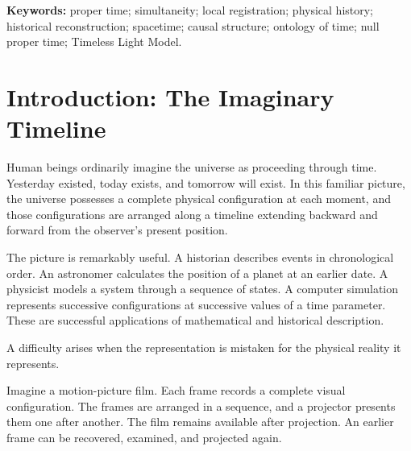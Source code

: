 \documentclass[12pt,onecolumn]{article}
\begin{document}
\begin{abstract}
The result also clarifies the null proper-time foundation of the Timeless Light Model. There is no universal clock from which the photon needs an exemption. Emission and absorption possess registered spacetime relationships, but the photon relation accumulates no internal proper time. The apparent paradox arises from assigning a universal temporal progression to physical reality and then treating light as an exception. Removing that assumption eliminates the need for the exception.

The proposed architecture is a universe of locally registered physical conditions governed by timeless lawful structure. Earlier configurations are reconstructed, and subsequent configurations are predicted. Neither is an additional layer of present physical actuality.

The past is not somewhere else. It is not somewhere at all.

\end{abstract}

\noindent\textbf{Keywords:} proper time; simultaneity; local registration; physical history; historical reconstruction; spacetime; causal structure; ontology of time; null proper time; Timeless Light Model.

\section{Introduction: The Imaginary Timeline}

Human beings ordinarily imagine the universe as proceeding through time. Yesterday existed, today exists, and tomorrow will exist. In this familiar picture, the universe possesses a complete physical configuration at each moment, and those configurations are arranged along a timeline extending backward and forward from the observer's present position.

The picture is remarkably useful. A historian describes events in chronological order. An astronomer calculates the position of a planet at an earlier date. A physicist models a system through a sequence of states. A computer simulation represents successive configurations at successive values of a time parameter. These are successful applications of mathematical and historical description.

A difficulty arises when the representation is mistaken for the physical reality it represents.

Imagine a motion-picture film. Each frame records a complete visual configuration. The frames are arranged in a sequence, and a projector presents them one after another. The film remains available after projection. An earlier frame can be recovered, examined, and projected again.
\end{document}
